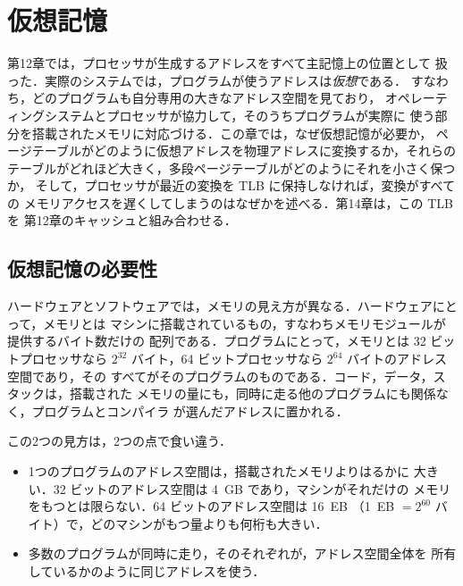\documentclass[../main.tex]{subfiles}
\begin{document}
\chapter{仮想記憶}

第12章では，プロセッサが生成するアドレスをすべて主記憶上の位置として
扱った．実際のシステムでは，プログラムが使うアドレスは\emph{仮想}である．
すなわち，どのプログラムも自分専用の大きなアドレス空間を見ており，
オペレーティングシステムとプロセッサが協力して，そのうちプログラムが実際に
使う部分を搭載されたメモリに対応づける．この章では，なぜ仮想記憶が必要か，
ページテーブルがどのように仮想アドレスを物理アドレスに変換するか，それらの
テーブルがどれほど大きく，多段ページテーブルがどのようにそれを小さく保つか，
そして，プロセッサが最近の変換を TLB に保持しなければ，変換がすべての
メモリアクセスを遅くしてしまうのはなぜかを述べる．第14章は，この TLB を
第12章のキャッシュと組み合わせる．

\section{仮想記憶の必要性}
\label{sec:l13-why}

ハードウェアとソフトウェアでは，メモリの見え方が異なる．ハードウェアにとって，メモリとは
マシンに搭載されているもの，すなわちメモリモジュールが提供するバイト数だけの
配列である．プログラムにとって，メモリとは 32 ビットプロセッサなら $2^{32}$
バイト，64 ビットプロセッサなら $2^{64}$ バイトのアドレス空間であり，その
すべてがそのプログラムのものである．コード，データ，スタックは，搭載された
メモリの量にも，同時に走る他のプログラムにも関係なく，プログラムとコンパイラ
が選んだアドレスに置かれる．

この2つの見方は，2つの点で食い違う．
\begin{itemize}
  \item 1つのプログラムのアドレス空間は，搭載されたメモリよりはるかに
    大きい．32 ビットのアドレス空間は 4~GB であり，マシンがそれだけの
    メモリをもつとは限らない．64 ビットのアドレス空間は 16~EB
    （1~EB $= 2^{60}$ バイト）で，どのマシンがもつ量よりも何桁も大きい．
  \item 多数のプログラムが同時に走り，そのそれぞれが，アドレス空間全体を
    所有しているかのように同じアドレスを使う．
\end{itemize}
\end{document}
